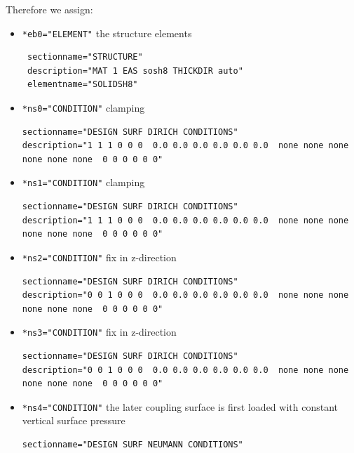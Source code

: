 Therefore we assign:
\begin{itemize}
 \item \verb|*eb0="ELEMENT"| \qquad the structure elements
 \begin{small} \begin{verbatim}
 sectionname="STRUCTURE"
 description="MAT 1 EAS sosh8 THICKDIR auto"
 elementname="SOLIDSH8"
 \end{verbatim} \end{small}
 \item \verb|*ns0="CONDITION"| \qquad clamping
 \begin{small} \begin{verbatim}
sectionname="DESIGN SURF DIRICH CONDITIONS"
description="1 1 1 0 0 0  0.0 0.0 0.0 0.0 0.0 0.0  none none none none none none  0 0 0 0 0 0"
 \end{verbatim} \end{small}
 \item \verb|*ns1="CONDITION"| \qquad clamping
 \begin{small} \begin{verbatim}
sectionname="DESIGN SURF DIRICH CONDITIONS"
description="1 1 1 0 0 0  0.0 0.0 0.0 0.0 0.0 0.0  none none none none none none  0 0 0 0 0 0"
 \end{verbatim} \end{small}
 \item \verb|*ns2="CONDITION"| \qquad fix in z-direction
 \begin{small} \begin{verbatim}
sectionname="DESIGN SURF DIRICH CONDITIONS"
description="0 0 1 0 0 0  0.0 0.0 0.0 0.0 0.0 0.0  none none none none none none  0 0 0 0 0 0"
 \end{verbatim} \end{small}
 \item \verb|*ns3="CONDITION"| \qquad fix in z-direction
 \begin{small} \begin{verbatim}
sectionname="DESIGN SURF DIRICH CONDITIONS"
description="0 0 1 0 0 0  0.0 0.0 0.0 0.0 0.0 0.0  none none none none none none  0 0 0 0 0 0"
 \end{verbatim} \end{small}
\item \verb|*ns4="CONDITION"| \qquad the later coupling surface is first loaded with constant vertical surface pressure
 \begin{small} \begin{verbatim}
sectionname="DESIGN SURF NEUMANN CONDITIONS"

\end{verbatim}
\end{small}
\end{itemize}
